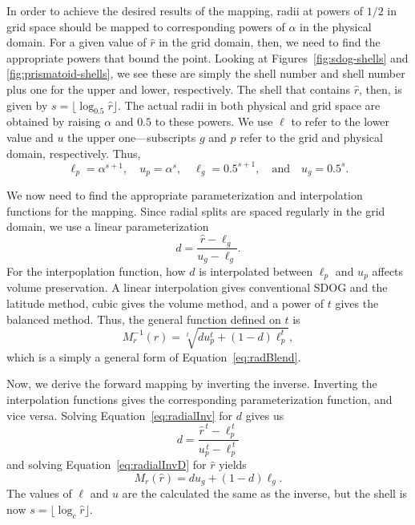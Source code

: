 In order to achieve the desired results of the mapping, radii at powers of $1/2$ in grid space should be mapped to corresponding powers of $\alpha$ in the physical domain.
For a given value of $\hat{r}$ in the grid domain, then, we need to find the appropriate powers that bound the point.
Looking at Figures~\ref{fig:sdog-shells} and \ref{fig:prismatoid-shells}, we see these are simply the shell number and shell number plus one for the upper and lower, respectively.
The shell that contains $\hat{r}$, then, is given by $s = \lfloor \log_{0.5} \hat{r} \rfloor$.
The actual radii in both physical and grid space are obtained by raising $\alpha$ and $0.5$ to these powers.
We use $\ell$ to refer to the lower value and $u$ the upper one---subscripts $g$ and $p$ refer to the grid and physical domain, respectively.
Thus,
%
\begin{equation*}
\ell_p = \alpha^{s + 1}, \quad u_p = \alpha^s, \quad \ell_g = 0.5^{s + 1}, \quad \text{and} \quad u_g = 0.5^s.
\end{equation*}
%

We now need to find the appropriate parameterization and interpolation functions for the mapping.
Since radial splits are spaced regularly in the grid domain, we use a linear parameterization
%
\begin{equation} \label{eq:radialInvD}
d = \frac{ \hat{r} - \ell_g }{ u_g - \ell_g }.
\end{equation}
%
For the interpoplation function, how $d$ is interpolated between $\ell_p$ and $u_p$ affects volume preservation.
A linear interpolation gives conventional SDOG and the latitude method, cubic gives the volume method, and a power of $t$ gives the balanced method.
Thus, the general function defined on $t$ is
%
\begin{equation} \label{eq:radialInv}
M_r^{-1}(\hat{r}) = \sqrt[t]{ d u_p^{t} + \left( 1 - d \right) \ell_p^{t} },
\end{equation}
%
which is a simply a general form of Equation~\ref{eq:radBlend}.


Now, we derive the forward mapping by inverting the inverse.
Inverting the interpolation functions gives the corresponding parameterization function, and vice versa.
Solving Equation~\ref{eq:radialInv} for $d$ gives us
%
\begin{equation} \label{radialForwD}
d = \frac{ \hat{r}^{\,t} - \ell_p^{\,t} }{ u_p^{\,t} - \ell_p^{\,t} }
\end{equation}
%
and solving Equation~\ref{eq:radialInvD} for $\hat{r}$ yields
%
\begin{equation} \label{eq:radialForw}
M_r (\hat{r}) = d u_g + \left( 1 - d \right) \ell_g.
\end{equation}
%
The values of $\ell$ and $u$ are the calculated the same as the inverse, but the shell is now $s = \lfloor \log_{c} \hat{r} \rfloor$.


